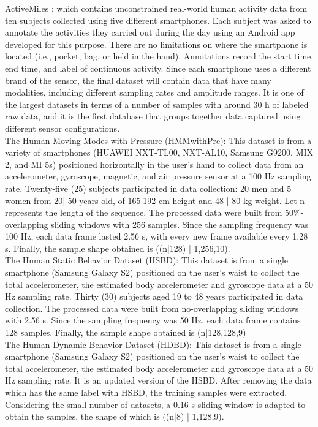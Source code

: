 \documentclass[10pt,halfline,a4paper]{ouparticle}
\begin{document}
\noindent ActiveMiles \cite{Ravi}: which contains unconstrained real-world human activity data from ten subjects collected using five different smartphones. Each subject was asked to annotate the activities they carried out during the day using an Android app developed for this purpose. There are no limitations on where the smartphone is located (i.e., pocket, bag, or held in the hand). Annotations record the start time, end time, and label of continuous activity. Since each smartphone uses a different brand of the sensor, the final dataset will contain data that have many modalities, including different sampling rates and amplitude ranges. It is one of the largest datasets in terms of a number of samples with around 30 h of labeled raw data, and it is the first database that groups together data captured using different sensor configurations.\\

\noindent The Human Moving Modes with Pressure (HMMwithPre): This dataset is from a variety of smartphones (HUAWEI NXT-TL00, NXT-AL10, Samsung G9200, MIX 2, and MI 5s) positioned horizontally in the user’s hand to collect data from an accelerometer, gyroscope, magnetic, and air pressure sensor at a 100 Hz sampling rate. Twenty-five (25) subjects participated in data collection: 20 men and 5 women from 20| 50 years old, of 165|192 cm height and 48 | 80 kg weight. Let n represents the length of the sequence. The processed data were built from 50\%-overlapping sliding windows with 256 samples. Since the sampling frequency was 100 Hz, each data frame lasted 2.56 s, with every new frame available every 1.28 s. Finally, the sample shape obtained is ((n|128) | 1,256,10).\\

\noindent The Human Static Behavior Dataset (HSBD): This dataset is from a single smartphone (Samsung Galaxy S2) positioned on the user’s waist to collect the total accelerometer, the estimated body accelerometer and gyroscope data at a 50 Hz sampling rate. Thirty (30) subjects aged 19 to 48 years participated in data collection. The processed data were built from no-overlapping sliding windows with 2.56 s. Since the sampling frequency was 50 Hz, each data frame contains 128 samples. Finally, the sample shape obtained is (n|128,128,9)\\

\noindent The Human Dynamic Behavior Dataset (HDBD): This dataset is from a single smartphone (Samsung Galaxy S2) positioned on the user’s waist to collect the total accelerometer, the estimated body accelerometer and gyroscope data at a 50 Hz sampling rate. It is an updated version of the HSBD. After removing the data which has the same label with HSBD, the training samples were extracted. Considering the small number of datasets, a 0.16 s sliding window is adapted to obtain the samples, the shape of which is ((n|8) | 1,128,9).\\
\end{document}
